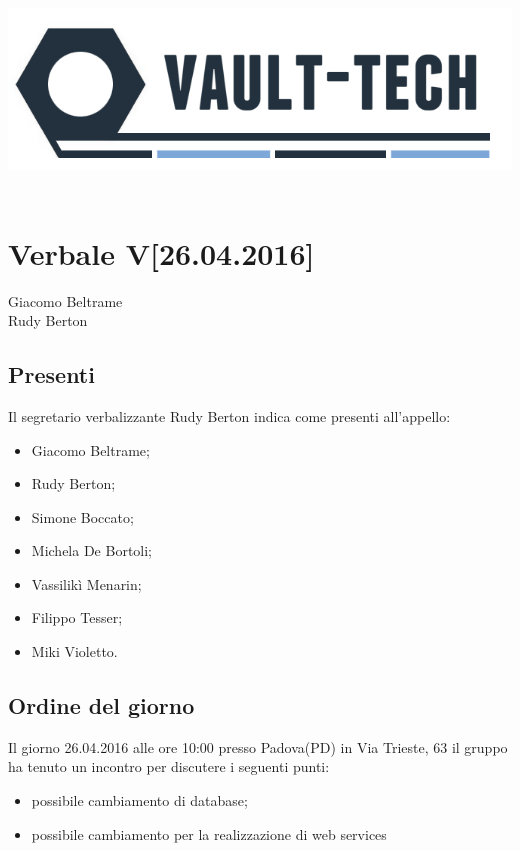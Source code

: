 \documentclass[a4paper]{article}
\def\DATA{26.04.2016}
\def\ORA{10:00}
\def\CITTA{Padova}
\def\PROVINCIA{PD}
\def\VIA{Via Trieste, 63}
\def\SEGRETARIO{Rudy Berton}
\def\RESPONSABILE{Giacomo Beltrame}
\begin{document}
\begin{center}
\includegraphics[scale=0.5]{Img/logo.png}\\
\vspace{1cm}
{\Huge \PROGETTO}\\
\vspace{1cm}
\section*{Verbale V[\DATA]}
\end{center}

%
%
 \RESPONSABILE
\\  \SEGRETARIO
\\
\subsection*{Presenti}
Il segretario verbalizzante \SEGRETARIO{} indica come presenti all'appello:
\begin{itemize}
\item Giacomo Beltrame;
\item Rudy Berton;
\item Simone Boccato;
\item Michela De Bortoli;
\item Vassilikì Menarin;
\item Filippo Tesser;
\item Miki Violetto.
\end{itemize}

\subsection*{Ordine del giorno}
Il giorno \DATA{} alle ore \ORA{} presso \CITTA (\PROVINCIA) in \VIA{} il gruppo \AUTORE{} ha tenuto un incontro per discutere i seguenti punti:
\begin{itemize}
\item possibile cambiamento di database;
\item possibile cambiamento per la realizzazione di web services

\end{itemize}
\end{document}
